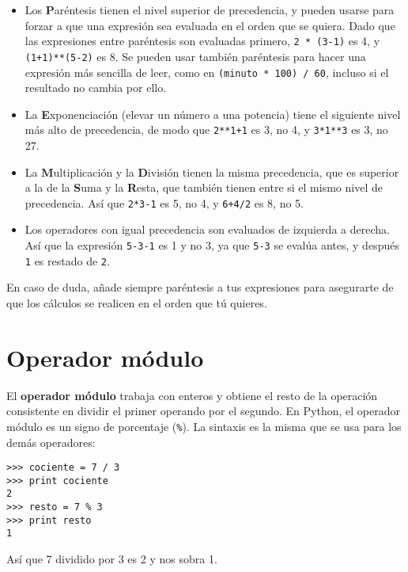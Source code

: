 \begin{itemize}

\item Los {\bf P}aréntesis tienen el nivel superior de precedencia, y pueden usarse
para forzar a que una expresión sea evaluada en el orden que se quiera. Dado
que las expresiones entre paréntesis son evaluadas primero, {\tt 2 * (3-1)} es 4,
y {\tt (1+1)**(5-2)} es 8. Se pueden usar también paréntesis para hacer una
expresión más sencilla de leer, como en {\tt (minuto * 100) / 60}, incluso
si el resultado no cambia por ello.

\item La {\bf E}xponenciación (elevar un número a una potencia) tiene el siguiente nivel más alto de
precedencia, de modo que {\tt 2**1+1} es 3, no 4, y {\tt 3*1**3} es 3, no 27.

\item La {\bf M}ultiplicación y la {\bf D}ivisión tienen la misma precedencia,
que es superior a la de la {\bf S}uma y la {\bf R}esta, que también tienen entre si el mismo
nivel de precedencia. Así que {\tt 2*3-1} es 5, no 4, y
{\tt 6+4/2} es 8, no 5.

\item Los operadores con igual precedencia son evaluados de izquierda a
derecha. Así que la expresión {\tt 5-3-1} es 1 y no 3, ya que
{\tt 5-3} se evalúa antes, y después {\tt 1} es restado de {\tt 2}.

\end{itemize}

En caso de duda, añade siempre paréntesis a tus expresiones para asegurarte
de que los cálculos se realicen en el orden que tú quieres.

\section{Operador módulo}


El {\bf operador módulo} trabaja con enteros y obtiene el resto
de la operación consistente en dividir el primer operando por el segundo. En Python, el
operador módulo es un signo de porcentaje (\verb"%"). La sintaxis es la misma
que se usa para los demás operadores:

\beforeverb
\begin{verbatim}
>>> cociente = 7 / 3
>>> print cociente
2
>>> resto = 7 % 3
>>> print resto
1
\end{verbatim}
\afterverb
%
Así que 7 dividido por 3 es 2 y nos sobra 1. 

